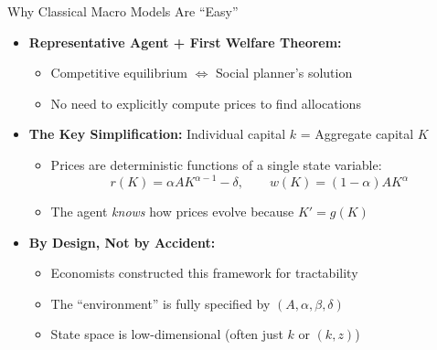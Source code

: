 \begin{frame}{Why Classical Macro Models Are ``Easy''}
\begin{itemize}
\item \textbf{Representative Agent + First Welfare Theorem:}
\begin{itemize}
    \item Competitive equilibrium $\Leftrightarrow$ Social planner's solution
    \item No need to explicitly compute prices to find allocations
\end{itemize}

\medskip
\item \textbf{The Key Simplification:} Individual capital $k$ = Aggregate capital $K$
\begin{itemize}
    \item Prices are deterministic functions of a single state variable:
    \[
    r(K) = \alpha A K^{\alpha - 1} - \delta, \qquad w(K) = (1-\alpha) A K^{\alpha}
    \]
    \item The agent \emph{knows} how prices evolve because $K' = g(K)$
\end{itemize}

\medskip
\item \textbf{By Design, Not by Accident:}
\begin{itemize}
    \item Economists constructed this framework for tractability
    \item The ``environment'' is fully specified by $(A, \alpha, \beta, \delta)$
    \item State space is low-dimensional (often just $k$ or $(k, z)$)
\end{itemize}
\end{itemize}
\end{frame}


